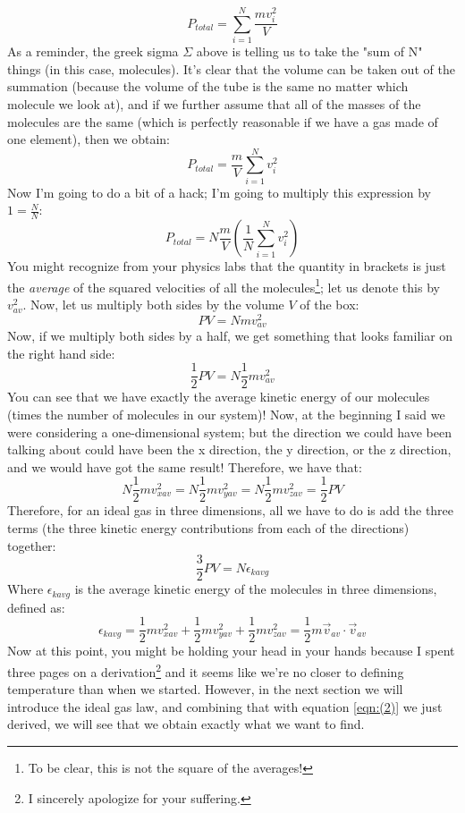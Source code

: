 \[P_{total} = \sum_{i=1}^N \frac{mv_i^2}{V}\]
As a reminder, the greek sigma $\Sigma$ above is telling us to take the "sum of N" things (in this case, molecules). It's clear that the volume can be taken out of the summation (because the volume of the tube is the same no matter which molecule we look at), and if we further assume that all of the masses of the molecules are the same (which is perfectly reasonable if we have a gas made of one element), then we obtain:
\[P_{total} = \frac{m}{V} \sum_{i=1}^N v_i^2 \]
Now I'm going to do a bit of a hack; I'm going to multiply this expression by $1 = \frac{N}{N}$:
\[P_{total} = N\frac{m}{V} \left(\frac{1}{N}\sum_{i=1}^N v_i^2 \right)\]
You might recognize from your physics labs that the quantity in brackets is just the \textit{average} of the squared velocities of all the molecules\footnote{To be clear, this is not the square of the averages!}; let us denote this by $v^2_{av}$. Now, let us multiply both sides by the volume $V$ of the box:
\[PV = Nmv^2_{av} \]
Now, if we multiply both sides by a half, we get something that looks familiar on the right hand side:
\[\frac{1}{2}PV = N\frac{1}{2}mv^2_{av} \]
You can see that we have exactly the average kinetic energy of our molecules (times the number of molecules in our system)! Now, at the beginning I said we were considering a one-dimensional system; but the direction we could have been talking about could have been the x direction, the y direction, or the z direction, and we would have got the same result! Therefore, we have that:
\[N\frac{1}{2}mv^2_{xav} = N\frac{1}{2}mv^2_{yav} = N\frac{1}{2}mv^2_{zav} = \frac{1}{2}PV \]
Therefore, for an ideal gas in three dimensions, all we have to do is add the three terms (the three kinetic energy contributions from each of the directions) together:
\begin{equation}
    \label{eqn:(2)}
    \frac{3}{2}PV = N\epsilon_{kavg}
\end{equation}
Where $\epsilon_{kavg}$ is the average kinetic energy of the molecules in three dimensions, defined as:
\begin{equation}
    \epsilon_{kavg} = \frac{1}{2}mv^2_{xav} + \frac{1}{2}mv^2_{yav} + \frac{1}{2}mv^2_{zav} = \frac{1}{2}m\vec{v}_{av} \cdot \vec{v}_{av}
\end{equation}
Now at this point, you might be holding your head in your hands because I spent three pages on a derivation\footnote{I sincerely apologize for your suffering.} and it seems like we're no closer to defining temperature than when we started. However, in the next section we will introduce the ideal gas law, and combining that with equation \ref{eqn:(2)} we just derived, we will see that we obtain exactly what we want to find. 
